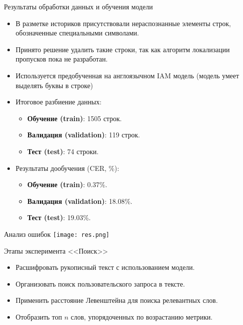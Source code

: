 \documentclass{beamer}
\begin{document}
\begin{frame}{Результаты обработки данных и обучения модели}
\begin{itemize}
    \item В разметке историков присутствовали нераспознанные элементы строк, обозначенные специальными символами.
    \item Принято решение удалить такие строки, так как алгоритм локализации пропусков пока не разработан.
    \item Используется предобученная на англоязычном IAM модель (модель умеет выделять буквы в строке)
    \item Итоговое разбиение данных:
    \begin{itemize}
        \item \textbf{Обучение (train)}: 1505 строк.
        \item \textbf{Валидация (validation)}: 119 строк.
        \item \textbf{Тест (test)}: 74 строки.
    \end{itemize}
    
    
    \item Результаты дообучения (CER, \%):
    \begin{itemize}
        \item \textbf{Обучение (train)}: 0.37\%.
        \item \textbf{Валидация (validation)}: 18.08\%.
        \item \textbf{Тест (test)}: 19.03\%.
    \end{itemize}
\end{itemize}
\end{frame}

\begin{frame}{Анализ ошибок}
    \texttt{[image: res.png]}
\end{frame}

\begin{frame}{Этапы эксперимента <<Поиск>>}
    \begin{itemize}
        \item Расшифровать рукописный текст с использованием модели.
        \item Организовать поиск пользовательского запроса в тексте.
        \item Применить расстояние Левенштейна для поиска релевантных слов.
        \item Отобразить топ $n$ слов, упорядоченных по возрастанию метрики.
    \end{itemize}
\end{frame}
\end{document}
